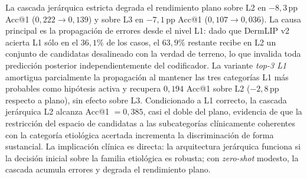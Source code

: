La cascada jerárquica estricta degrada el rendimiento plano sobre
L2 en $-8{,}3$\,pp Acc@1 ($0{,}222 \to 0{,}139$) y sobre L3 en
$-7{,}1$\,pp Acc@1 ($0{,}107 \to 0{,}036$). La causa
principal es la propagación de errores desde el nivel L1: dado que
DermLIP v2 acierta L1 sólo en el $36{,}1\%$ de los casos, el
$63{,}9\%$ restante recibe en L2 un conjunto de candidatas
desalineado con la verdad de terreno, lo que invalida toda
predicción posterior independientemente del codificador. La
variante \emph{top-3 L1} amortigua parcialmente la propagación al
mantener las tres categorías L1 más probables como hipótesis activa
y recupera $0{,}194$ Acc@1 sobre L2 ($-2{,}8$\,pp respecto a
plano), sin efecto sobre L3. Condicionado a L1 correcto, la
cascada jerárquica L2 alcanza Acc@1 $= 0{,}385$, casi el doble
del plano, evidencia de que la restricción del espacio de
candidatas a las subcategorías clínicamente coherentes con la
categoría etiológica acertada incrementa la discriminación de
forma sustancial. La implicación clínica es directa: la arquitectura
jerárquica funciona si la decisión inicial sobre la familia
etiológica es robusta; con \emph{zero-shot} modesto, la cascada
acumula errores y degrada el rendimiento plano.
